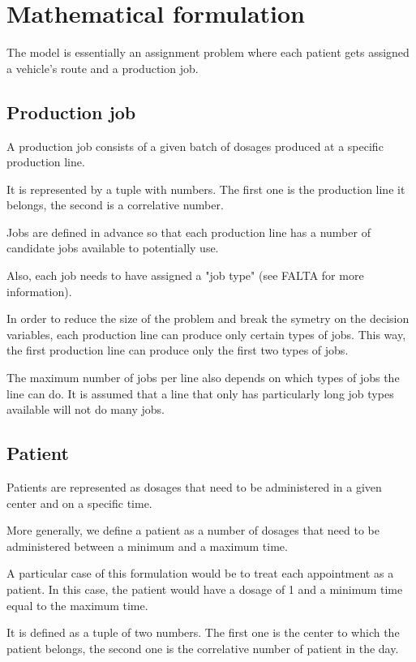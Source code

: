 \chapter{Mathematical formulation}

The model is essentially an assignment problem where each patient gets assigned a vehicle's route and a production job.

\section{Production job}

A production job consists of a given batch of dosages produced at a specific production line.

It is represented by a tuple with numbers. The first one is the production line it belongs, the second is a correlative number.

Jobs are defined in advance so that each production line has a number of candidate jobs available to potentially use.

Also, each job needs to have assigned a "job type" (see FALTA for more information).

In order to reduce the size of the problem and break the symetry on the decision variables, each production line can produce only certain types of jobs. This way, the first production line can produce only the first two types of jobs.

The maximum number of jobs per line also depends on which types of jobs the line can do. It is assumed that a line that only has particularly long job types available will not do many jobs.

\section{Patient}

Patients are represented as dosages that need to be administered in a given center and on a specific time.

More generally, we define a patient as a number of dosages that need to be administered between a minimum and a maximum time. 

A particular case of this formulation would be to treat each appointment as a patient. In this case, the patient would have a dosage of 1 and a minimum time equal to the maximum time.

It is defined as a tuple of two numbers. The first one is the center to which the patient belongs, the second one is the correlative number of patient in the day.

